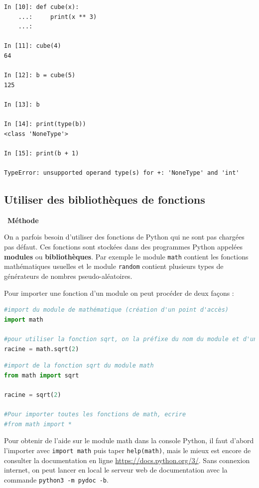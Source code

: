 \documentclass[a4paper, french, 12pt]{article}  %
\newcounter{def}
\newcounter{prog}
\newenvironment{methode}[1]
{\par \medskip    \noindent  
 \begin {bclogo}[arrondi =0.1,logo=\bcoutil, marge=4,noborder = true] {~\textbf{Méthode}   {\itshape #1} }  \par}
{
\end{bclogo}
 \par \bigskip }
\begin{document}
\begin{lstlisting}[style=compil]
In [10]: def cube(x):
    ...:     print(x ** 3)
    ...:     

In [11]: cube(4)
64

In [12]: b = cube(5)
125

In [13]: b

In [14]: print(type(b))
<class 'NoneType'>

In [15]: print(b + 1)

TypeError: unsupported operand type(s) for +: 'NoneType' and 'int'
\end{lstlisting}

\subsection{Utiliser des bibliothèques de fonctions}

\begin{methode}{}
On a parfois besoin d'utiliser des fonctions de Python qui ne sont pas chargées pas défaut. Ces fonctions sont stockées dans des programmes Python appelées \textbf{modules} ou \textbf{bibliothèques}. Par exemple le module \texttt{math} contient les fonctions mathématiques usuelles et le module \texttt{random} contient plusieurs types de générateurs de nombres pseudo-aléatoires.

Pour importer une fonction d'un module on peut procéder de deux façons :
\begin{lstlisting}[language=python,title=Première façon]
#import du module de mathématique (création d'un point d'accès)
import math

#pour utiliser la fonction sqrt, on la préfixe du nom du module et d'un point
racine = math.sqrt(2)
\end{lstlisting}

\begin{lstlisting}[language=python,title=Deuxième façon]
#import de la fonction sqrt du module math
from math import sqrt

racine = sqrt(2)

#Pour importer toutes les fonctions de math, ecrire
#from math import *  
\end{lstlisting}

Pour obtenir de l'aide sur le module math dans la console Python, il faut d'abord l'importer avec \texttt{import math} puis taper \texttt{help(math)}, mais le mieux est encore de consulter la documentation en ligne \url{https://docs.python.org/3/}. Sans connexion internet, on peut   lancer en local  le serveur web de documentation avec la commande \texttt{python3 -m pydoc -b}.
 \end{methode}
 
\end{document}

